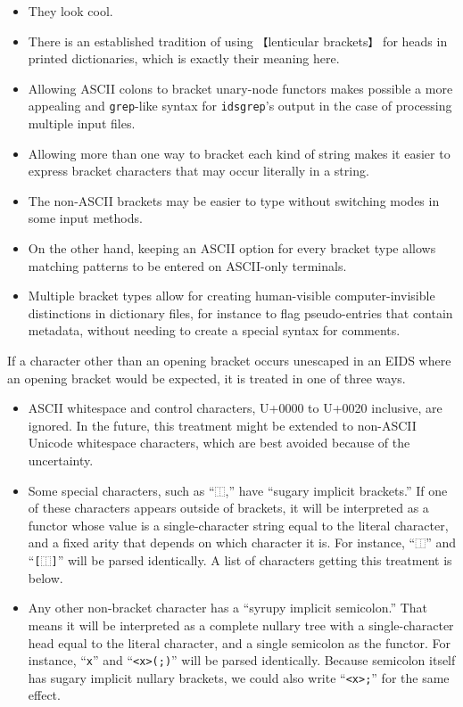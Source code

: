 \documentclass[twocolumn]{report}
\begin{document}
\begin{itemize}
  \item They look cool.
  \item There is an established tradition of using \texttt{【}lenticular
    brackets\texttt{】} for heads in printed dictionaries, which is exactly
    their meaning here.
  \item Allowing ASCII colons to bracket unary-node functors makes possible
    a more appealing and \texttt{grep}-like syntax for \texttt{idsgrep}'s
    output in the case of processing multiple input files.
  \item Allowing more than one way to bracket each kind of string makes it
    easier to express bracket characters that may occur literally in a string.
  \item The non-ASCII brackets may be easier to type without switching modes
    in some input methods.
  \item On the other hand, keeping an ASCII option for every bracket type
    allows matching patterns to be entered on ASCII-only terminals.
  \item Multiple bracket types allow for creating human-visible
    computer-invisible distinctions in dictionary files, for instance to
    flag pseudo-entries that contain metadata, without needing to create a
    special syntax for comments.
\end{itemize}

If a character other than an opening bracket occurs unescaped
in an EIDS where an opening bracket would be expected, it is treated
in one of three ways.

\begin{itemize}
  \item ASCII whitespace and control characters, U+0000 to U+0020 inclusive,
    are ignored.  In the future, this treatment might be extended to
    non-ASCII Unicode whitespace characters, which are best avoided because
    of the uncertainty.
  \item Some special characters, such as ``\texttt{⿰},'' have ``sugary
    implicit brackets.''  If one of these characters appears outside of
    brackets, it will be interpreted as a functor whose value is a
    single-character string equal to the literal character, and a fixed
    arity that depends on which character it is.  For instance,
    ``\texttt{⿰}'' and ``\texttt{[⿰]}'' will be parsed identically.
    A list of characters getting this treatment is below.
  \item Any other non-bracket character has a ``syrupy implicit semicolon.''
    That means it will be interpreted as a complete nullary tree with
    a single-character head equal to the literal character, and a
    single semicolon as the functor.  For instance, ``\texttt{x}'' and
    ``\texttt{<x>(;)}'' will be parsed identically.  Because semicolon
    itself has sugary implicit nullary brackets, we could also write
    ``\texttt{<x>;}'' for the same effect.
\end{itemize}
\end{document}
